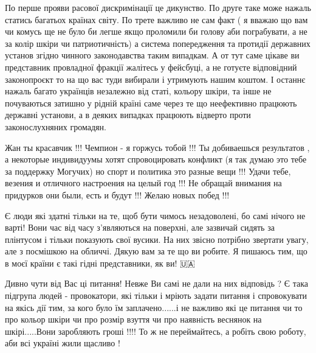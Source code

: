 \begin{itemize}

По перше прояви расової дискримінації це дикунство. По друге таке може нажаль
статись багатьох країнах світу. По трете важливо не сам факт ( я вважаю що вам
чи комусь ще не було би легше якщо проломили би голову аби пограбувати, а не за
колір шкіри чи патриотичність) а система попередження та протидії державних
установ згідно чинного законодавства таким випадкам. А от тут саме цікаве ви
представник провладної фракції жалітесь у фейсбуці, а не готуєте відповідний
законопроєкт то на що вас туди вибирали і утримують нашим коштом. І останнє
нажаль багато українців незалежно від статі, кольору шкіри, та інше не
почуваються затишно у рідній країні саме через те що неефективно працюють
державні установи, а в деяких випадках працюють відверто проти законослухняних
громадян.


Жан ты красавчик !!! Чемпион - я горжусь тобой !!! Ты добиваешься результатов ,
а некоторые индивидуумы хотят спровоцировать конфликт (я так думаю это тебе за
поддержку Могучих) но спорт и политика это разные вещи !!! Удачи тебе, везения
и отличного настроения на целый год !!! Не обращай внимания на придурков они
были, есть и будут !!! Желаю новых побед !!!

 

Є люди які здатні тільки на те, щоб бути чимось незадоволені, бо самі нічого не
варті! Вони час від часу з’являються на поверхні, але зазвичай сидять за
плінтусом і тільки показують свої вусики. На них звісно потрібно звертати
увагу, але з посмішкою на обличчі. Дякую вам за те що ви робите. Я пишаюсь тим,
що в моєї країни є такі гідні представники, як ви! 🇺🇦


 

Дивно чути від Вас ці питання! Невже Ви самі не дали на них відповідь ? Є така
підгрупа людей - провокатори, які тільки і мріють задати питання і спровокувати
на якісь дії тим, за кого було їм заплачено......і не важливо які це питання чи
то про кольор шкіри чи про розмір взуття чи про наявність веснянок на
шкірі.....Вони заробляють гроші !!!! То ж не переймайтесь, а робіть свою
роботу, аби всі україні жили щасливо !



\end{itemize}
